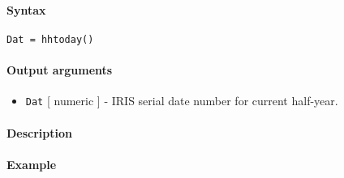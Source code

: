 


	\paragraph{Syntax}\label{syntax}

\begin{verbatim}
Dat = hhtoday()
\end{verbatim}

\paragraph{Output arguments}\label{output-arguments}

\begin{itemize}
\itemsep1pt\parskip0pt
\item
  \texttt{Dat} {[} numeric {]} - IRIS serial date number for current
  half-year.
\end{itemize}

\paragraph{Description}\label{description}

\paragraph{Example}\label{example}


